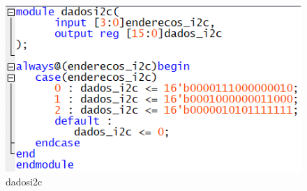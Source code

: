 \documentclass[14pt, oneside]{book}
\theoremstyle{definition}
\begin{document}
                    \begin{figure}[!h]
                        \centering
                        \includegraphics[scale=1]{dadosi2c.png}
                        \caption{dadosi2c}
                        \label{fig:dadosi2c}
                    \end{figure}
                    
\end{document}
